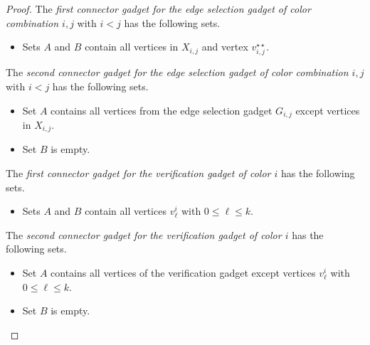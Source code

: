 \documentclass[a4paper,UKenglish,cleveref, autoref, thm-restate]{lipics-v2021}
\begin{document}
\begin{proof}
    The \emph{first connector gadget for the edge selection gadget of color combination $i,j$} with $i<j$ has the following sets.
    \begin{itemize}
        \item Sets $A$ and $B$ contain all vertices in $X_{i,j}$ and vertex $v_{i,j}^{\star\star}$.
    \end{itemize}
    The \emph{second connector gadget for the edge selection gadget of color combination $i,j$} with $i<j$ has the following sets.
    \begin{itemize}
        \item Set $A$ contains all vertices from the edge selection gadget $G_{i,j}$ except vertices in $X_{i,j}$.
        \item Set $B$ is empty.
    \end{itemize}
    The \emph{first connector gadget for the verification gadget of color $i$} has the following sets.
    \begin{itemize}
        \item Sets $A$ and $B$ contain all vertices $v^i_\ell$ with $0\le \ell\le k$.
    \end{itemize}
The \emph{second connector gadget for the verification gadget of color $i$} has the following sets.
    \begin{itemize}
        \item Set $A$ contains all vertices of the verification gadget except vertices $v^i_\ell$ with $0\le \ell \le k$.
        \item Set $B$ is empty.
    \end{itemize}


\end{proof}
\end{document}

